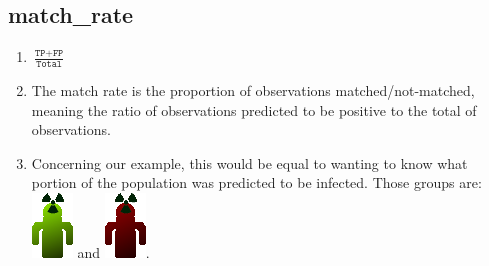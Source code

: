 \documentclass[12pt,a4paper]{article}
\begin{document}
\subsection{match\_rate}
\begin{enumerate}
\item $\frac{\texttt{TP}+\texttt{FP}}{\texttt{Total}}$
\item The match rate is the proportion of observations matched/not-matched, meaning the ratio of observations predicted to be positive to the total of observations.
\item Concerning our example, this would be equal to wanting to know what portion of the population was predicted to be infected. Those groups are: \includegraphics[scale=0.3]{resources/5/exampleTP} and \includegraphics[scale=0.3]{resources/5/exampleFP}.

\end{enumerate}
\end{document}
